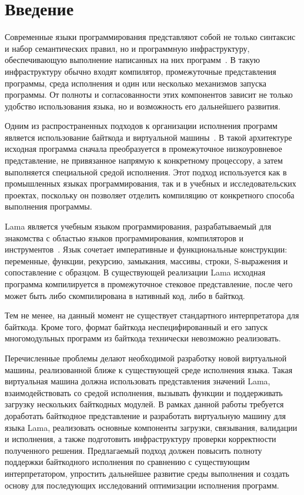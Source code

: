 
\section*{Введение}
\thispagestyle{withCompileDate}
Современные языки программирования представляют собой не только синтаксис и набор семантических правил, но и программную инфраструктуру, обеспечивающую выполнение написанных на них программ~\cite{AhoCompilers, EngineeringCompiler}. В такую инфраструктуру обычно входят компилятор, промежуточные представления программы, среда исполнения и один или несколько механизмов запуска программы. От полноты и согласованности этих компонентов зависит не только удобство использования языка, но и возможность его дальнейшего развития.

Одним из распространенных подходов  к организации исполнения программ является использование байткода и виртуальной машины~\cite{JVMspec, PythonVM, LuaVM}. В такой архитектуре исходная программа сначала преобразуется в промежуточное низкоуровневое представление, не привязанное напрямую к конкретному процессору, а затем выполняется специальной средой исполнения. Этот подход используется как в промышленных языках программирования, так и в учебных и исследовательских проектах, поскольку он позволяет отделить компиляцию от конкретного способа выполнения программы.

Lama является учебным языком программирования, разрабатываемый для знакомства с областью языков
программирования, компиляторов и инструментов~\cite{LamaReadme,LamaSpec}. Язык сочетает императивные
и функциональные конструкции: переменные, функции, рекурсию, замыкания, массивы, строки, S-выражения
и сопоставление с образцом. В существующей реализации Lama исходная программа компилируется в
промежуточное стековое представление, после чего может быть либо скомпилирована в нативный код, либо
в байткод.

Тем не менее, на данный момент не существует стандартного интерпретатора для байткода.
Кроме того, формат байткода неспецифированный и его запуск многомодульных программ из байткода технически невозможно реализовать.

Перечисленные проблемы делают необходимой разработку новой виртуальной машины, реализованной ближе к существующей среде исполнения языка. Такая виртуальная машина должна использовать представления значений Lama, взаимодействовать со средой исполнения, вызывать функции и поддерживать загрузку нескольких байткодных модулей. В рамках данной работы требуется доработать байткодное представление и разработать виртуальную машину для языка Lama, реализовать основные компоненты загрузки, связывания, валидации и исполнения, а также подготовить инфраструктуру проверки корректности полученного решения. Предлагаемый подход должен повысить полноту поддержки байткодного исполнения по сравнению с существующим интерпретатором, упростить дальнейшее развитие среды выполнения и создать основу для последующих исследований оптимизации исполнения программ.
